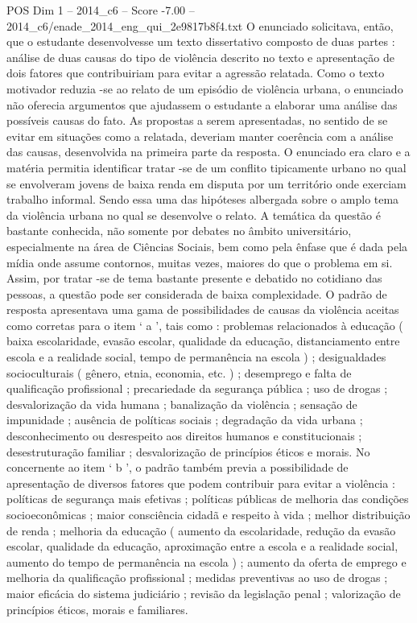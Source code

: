 \begin{textsample}{POS Dim 1 – 2014\_c6 – Score -7.00 – 2014\_c6/enade\_2014\_eng\_qui\_2e9817b8f4.txt}
O enunciado solicitava, então, que o estudante desenvolvesse um texto dissertativo composto de duas partes : análise de duas causas do tipo de violência descrito no texto e apresentação de dois fatores que contribuiriam para evitar a agressão relatada.
Como o texto motivador reduzia -se ao relato de um episódio de violência urbana, o enunciado não oferecia argumentos que ajudassem o estudante a elaborar uma análise das possíveis causas do fato.
As propostas a serem apresentadas, no sentido de se evitar em situações como a relatada, deveriam manter coerência com a análise das causas, desenvolvida na primeira parte da resposta.
O enunciado era claro e a matéria permitia identificar tratar -se de um conflito tipicamente urbano no qual se envolveram jovens de baixa renda em disputa por um território onde exerciam trabalho informal.
Sendo essa uma das hipóteses albergada sobre o amplo tema da violência urbana no qual se desenvolve o relato.
A temática da questão é bastante conhecida, não somente por debates no âmbito universitário, especialmente na área de Ciências Sociais, bem como pela ênfase que é dada pela mídia onde assume contornos, muitas vezes, maiores do que o problema em si.
Assim, por tratar -se de tema bastante presente e debatido no cotidiano das pessoas, a questão pode ser considerada de baixa complexidade.
O padrão de resposta apresentava uma gama de possibilidades de causas da violência aceitas como corretas para o item ‘ a ’, tais como : problemas relacionados à educação ( baixa escolaridade, evasão escolar, qualidade da educação, distanciamento entre escola e a realidade social, tempo de permanência na escola ) ; desigualdades socioculturais ( gênero, etnia, economia, etc. ) ; desemprego e falta de qualificação profissional ; precariedade da segurança pública ; uso de drogas ; desvalorização da vida humana ; banalização da violência ; sensação de impunidade ; ausência de políticas sociais ; degradação da vida urbana ; desconhecimento ou desrespeito aos direitos humanos e constitucionais ; desestruturação familiar ; desvalorização de princípios éticos e morais.
No concernente ao item ‘ b ’, o padrão também previa a possibilidade de apresentação de diversos fatores que podem contribuir para evitar a violência : políticas de segurança mais efetivas ; políticas públicas de melhoria das condições socioeconômicas ; maior consciência cidadã e respeito à vida ; melhor distribuição de renda ; melhoria da educação ( aumento da escolaridade, redução da evasão escolar, qualidade da educação, aproximação entre a escola e a realidade social, aumento do tempo de permanência na escola ) ; aumento da oferta de emprego e melhoria da qualificação profissional ; medidas preventivas ao uso de drogas ; maior eficácia do sistema judiciário ; revisão da legislação penal ; valorização de princípios éticos, morais e familiares.

\end{textsample}

